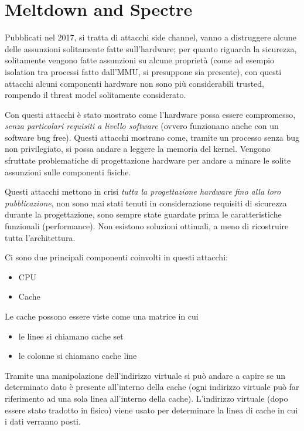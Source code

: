 \section{Meltdown and Spectre}

Pubblicati nel 2017, si tratta di attacchi side channel, vanno a distruggere alcune delle assunzioni solitamente fatte sull'hardware; per quanto riguarda la sicurezza, solitamente vengono fatte assunzioni su alcune proprietà (come ad esempio isolation tra processi fatto dall'MMU, si presuppone sia presente), con questi attacchi alcuni componenti hardware non sono più considerabili trusted, rompendo il threat model solitamente considerato.

Con questi attacchi è stato mostrato come l'hardware possa essere compromesso, \textit{senza particolari requisiti a livello software} (ovvero funzionano anche con un software bug free). Questi attacchi mostrano come, tramite un processo senza bug non privilegiato, si possa andare a leggere la memoria del kernel. Vengono sfruttate problematiche di progettazione hardware per andare a minare le solite assunzioni sulle componenti fisiche.

Questi attacchi mettono in crisi \textit{tutta la progettazione hardware fino alla loro pubblicazione}, non sono mai stati tenuti in considerazione requisiti di sicurezza durante la progettazione, sono sempre state guardate prima le caratteristiche funzionali (performance). Non esistono soluzioni ottimali, a meno di ricostruire tutta l'architettura.

Ci sono due principali componenti coinvolti in questi attacchi: 
\begin{itemize}
	\item CPU
	\item Cache
\end{itemize}

Le cache possono essere viste come una matrice in cui
\begin{itemize}
	\item le linee si chiamano cache set
	\item le colonne si chiamano cache line
\end{itemize}

Tramite una manipolazione dell'indirizzo virtuale si può andare a capire se un determinato dato è presente all'interno della cache (ogni indirizzo virtuale può far riferimento ad una sola linea all'interno della cache). L'indirizzo virtuale (dopo essere stato tradotto in fisico) viene usato per determinare la linea di cache in cui i dati verranno posti. 

